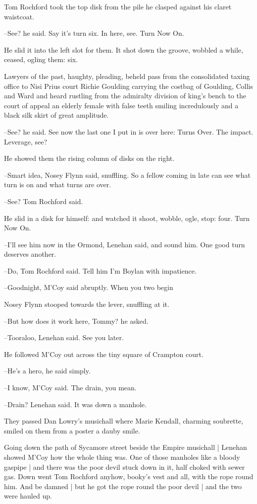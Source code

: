 Tom Rochford took the top disk from the pile
he clasped against his claret waistcoat.

--See?
he said.
Say it's turn six.
In here, see.
Turn Now On.

He slid it into the left slot for them.
It shot down the groove,
wobbled a while,
ceased,
ogling them:
six.

Lawyers of the past, haughty, pleading,
beheld pass from the
consolidated taxing office
to Nisi Prius court
Richie Goulding carrying
the costbag of Goulding, Collis and Ward
and heard rustling from the
admiralty division of king's bench
to the court of appeal
an elderly
female with false teeth smiling incredulously
and a black silk skirt of
great amplitude.

--See?
he said.
See now the last one I put in is over here:
Turns Over.
The impact. Leverage, see?

He showed them the rising column of disks on the right.

--Smart idea,
Nosey Flynn said, snuffling.
So a fellow coming in late can
see what turn is on and what turns are over.

--See?
Tom Rochford said.

He slid in a disk for himself:
and watched it shoot, wobble, ogle, stop:
four.
Turn Now On.

--I'll see him now in the Ormond,
Lenehan said,
and sound him.
One good
turn deserves another.

--Do,
Tom Rochford said.
Tell him I'm Boylan with impatience.

--Goodnight,
M'Coy said abruptly.
When you two begin

Nosey Flynn stooped towards the lever,
snuffling at it.

--But how does it work here, Tommy?
he asked.

--Tooraloo,
Lenehan said.
See you later.

He followed M'Coy out
across the tiny square of Crampton court.

--He's a hero,
he said simply.

--I know,
M'Coy said.
The drain, you mean.

--Drain?
Lenehan said.
It was down a manhole.

They passed Dan Lowry's musichall
where Marie Kendall, charming
soubrette,
smiled on them from a poster
a dauby smile.

Going down the path of Sycamore street beside the Empire musichall |
Lenehan showed M'Coy how the whole thing was.
One of those manholes like a bloody gaspipe |
and there was the poor devil stuck down in it,
half choked with sewer gas.
Down went Tom Rochford anyhow,
booky's vest and all,
with the rope round him.
And be damned |
but he got the rope round the poor devil |
and the two were hauled up.

